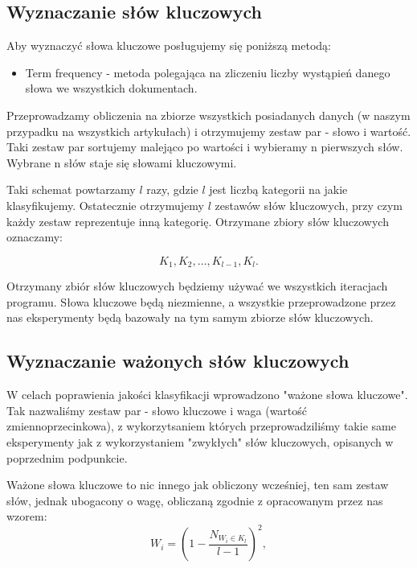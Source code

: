 \documentclass{classrep}
\begin{document}
\subsection{Wyznaczanie słów kluczowych}

Aby wyznaczyć słowa kluczowe posługujemy się poniższą metodą:

\begin{itemize}[label=$\bullet$\scshape\bfseries]
\item Term frequency - metoda polegająca na zliczeniu liczby wystąpień danego słowa we wszystkich dokumentach.
\end{itemize}

Przeprowadzamy obliczenia na zbiorze wszystkich posiadanych danych (w naszym przypadku na wszystkich artykułach) i otrzymujemy zestaw par - słowo i wartość. Taki zestaw par sortujemy malejąco po wartości i wybieramy n pierwszych słów. Wybrane n słów staje się słowami kluczowymi. \newline

Taki schemat powtarzamy $l$ razy, gdzie $l$ jest liczbą kategorii na jakie klasyfikujemy. Ostatecznie otrzymujemy $l$ zestawów słów kluczowych, przy czym każdy zestaw reprezentuje inną kategorię. Otrzymane zbiory słów kluczowych oznaczamy:

\begin{equation}
            K_{1}, K_{2}, \ldots , K_{l-1}, K_{l}.
 \end{equation}	

Otrzymany zbiór słów kluczowych będziemy używać we wszystkich iteracjach programu. Słowa kluczowe będą niezmienne, a wszystkie przeprowadzone przez nas eksperymenty będą bazowały na tym samym zbiorze słów kluczowych.

\subsection{Wyznaczanie ważonych słów kluczowych}

W celach poprawienia jakości klasyfikacji wprowadzono "ważone słowa kluczowe". Tak nazwaliśmy zestaw par - słowo kluczowe i waga (wartość zmiennoprzecinkowa), z wykorzytsaniem których przeprowadziliśmy takie same eksperymenty jak z wykorzystaniem "zwykłych" słów kluczowych, opisanych w poprzednim podpunkcie. \newline

Ważone słowa kluczowe to nic innego jak obliczony wcześniej, ten sam zestaw słów, jednak ubogacony o wagę, obliczaną zgodnie z opracowanym przez nas wzorem:
\begin{equation}
            W_{i} = \left({1 - \frac{N_{W_{i} \in K_{l}}}{l - 1}}\right)^2,
 \end{equation}	
\end{document}
